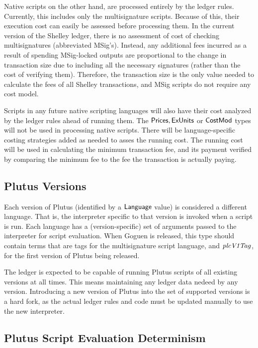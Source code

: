 Native scripts on the other hand, are processed entirely by the ledger rules.
Currently, this includes only the multisignature scripts.
Because of this, their execution cost can easily be assessed before processing them.
In the current version of the Shelley ledger, there is no assessment of cost
of checking multisignatures (abbreviated MSig's). Instead, any additional fees 
incurred as a result of
spending MSig-locked outputs are proportional to the change in transaction
size due to including all the necessary signatures (rather than the
cost of verifying them). Therefore, the transaction size is the only
value needed to calculate the fees of all Shelley transactions, and MSig
scripts do not require any cost model.

Scripts in any future native scripting languages will also
have their cost analyzed by the ledger rules ahead of running them.
The $\mathsf{Prices}, \mathsf{ExUnits}$ or $\mathsf{CostMod}$ types will not be used
in processing native scripts. There will be language-specific
costing strategies added as needed to asses the running cost.
The running cost will be used in calculating the minimum transaction
fee, and its payment verified by comparing the minimum fee to the fee the transaction
is actually paying.

\subsection{Plutus Versions}
\label{sec:versions}

Each
version of Plutus (identified by a $\mathsf{Language}$ value) is considered a different
language. That is, the interpreter
specific to that version is invoked when a script is run. Each language
has a (version-specific) set of arguments passed to the interpreter
for script evaluation. When Goguen is released, this type should contain
terms that are tags for the multisignature script language, and $\mathit{plcV1Tag}$,
for the first version of Plutus being released.

The ledger is expected to be capable of running Plutus scripts of
all existing versions at all times. This means maintaining any ledger
data nedeed by any version. Introducing a new version of Plutus
into the set of supported versions is a hard fork, as the actual ledger rules
and code must be updated manually to use the new interpreter.

\subsection{Plutus Script Evaluation Determinism}
\label{sec:determinism}

